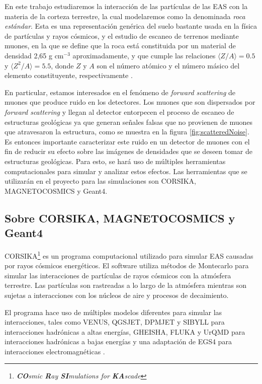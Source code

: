 \documentclass[12pt]{report}
\begin{document}
En este trabajo estudiaremos la interacción de las partículas de las EAS con la materia de la corteza terrestre, la cual modelaremos como la denominada \textit{roca estándar}. Esta es una representación genérica del suelo bastante usada en la física de partículas y rayos cósmicos, y el estudio de escaneo de terrenos mediante muones, en la que se define que la roca está constituida por un material de densidad 2,65 g cm$^{-3}$ aproximadamente, y que cumple las relaciones $\langle Z/A \rangle=0.5$ y $\langle Z^2/A \rangle=5.5$, donde $Z$ y $A$ son el número atómico y el número másico del elemento constituyente, respectivamente \cite{groom2001muon}.

En particular, estamos interesados en el fenómeno de \textit{forward scattering} de muones que produce ruido en los detectores. Los muones que son dispersados por \textit{forward scattering} y llegan al detector entorpecen el proceso de escaneo de estructuras geológicas ya que generan señales falsas que no provienen de muones que atravesaron la estructura, como se muestra en la figura \ref{fig:scatteredNoise}. Es entonces importante caracterizar este ruido en un detector de muones con el fin de reducir su efecto sobre las imágenes de densidades que se deseen tomar de estructuras geológicas. Para esto, se hará uso de múltiples herramientas computacionales para simular y analizar estos efectos. Las herramientas que se utilizarán en el proyecto para las simulaciones son CORSIKA, MAGNETOCOSMICS y Geant4.



\subsection*{Sobre CORSIKA, MAGNETOCOSMICS y Geant4}

CORSIKA\footnote{\textit{\textbf{CO}smic \textbf{R}ay \textbf{SI}mulations for \textbf{KA}scade}} es un programa computacional utilizado para simular EAS causadas por rayos cósmicos energéticos. El software utiliza métodos de Montecarlo para simular las interacciones de partículas de rayos cósmicos con la atmósfera terrestre. Las partículas son rastreadas a lo largo de la atmósfera mientras son sujetas a interacciones con los núcleos de aire y procesos de decaimiento.

El programa hace uso de múltiples modelos diferentes para simular las interacciones, tales como VENUS, QGSJET, DPMJET y SIBYLL para interacciones hadrónicas a altas energías, GHEISHA, FLUKA y UrQMD para interacciones hadrónicas a bajas energías y una adaptación de EGS4 para interacciones electromagnéticas \cite{heck1998corsika}.
\end{document}
